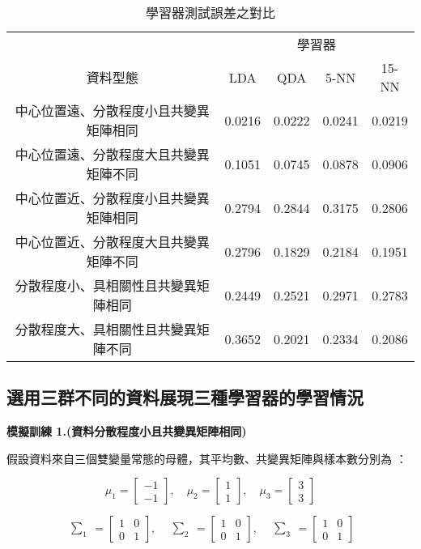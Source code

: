 \begin{table}[H] 
\centering
\caption{學習器測試誤差之對比}\label{tb:error_2}
\tabcolsep=12pt
\begin{tabular}{ccccc} 
\toprule
& \multicolumn{4}{c}{學習器}\\
\cmidrule(l){2-5}
資料型態 & LDA & QDA & 5-NN & 15-NN\\[3pt]
\midrule
中心位置遠、分散程度小且共變異矩陣相同 & \cellcolor{red!25}0.0216 & 0.0222 & 0.0241 & 0.0219  \\[3pt]
中心位置遠、分散程度大且共變異矩陣不同 & 0.1051 & \cellcolor{red!25}0.0745 & 0.0878 & 0.0906 \\[3pt]
中心位置近、分散程度小且共變異矩陣相同 & \cellcolor{red!25}0.2794 & 0.2844 & 0.3175 & 0.2806 \\[3pt]
中心位置近、分散程度大且共變異矩陣不同 & 0.2796 & \cellcolor{red!25}0.1829 & 0.2184 & 0.1951 \\ [3pt]
分散程度小、具相關性且共變異矩陣相同 & \cellcolor{red!25}0.2449 & 0.2521 & 0.2971 & 0.2783 \\ [3pt]
分散程度大、具相關性且共變異矩陣不同 & 0.3652 & \cellcolor{red!25}0.2021 & 0.2334 & 0.2086 \\ 
\bottomrule
\end{tabular}
\end{table} 
\subsection{選用三群不同的資料展現三種學習器的學習情況}
\textbf{\large 模擬訓練 1.(資料分散程度小且共變異矩陣相同)}

假設資料來自三個雙變量常態的母體，其平均數、共變異矩陣與樣本數分別為 ：

\[\mu_1 = \begin{bmatrix}
-1 \\
-1
\end{bmatrix}, \quad \mu_2 = \begin{bmatrix}
1 \\
1
\end{bmatrix}, \quad \mu_3 = \begin{bmatrix}
3 \\
3
\end{bmatrix}\]

\[\begin{matrix} \sum_{1} \end{matrix} = \begin{bmatrix}
1 & 0\\
0 & 1
\end{bmatrix}, \quad \begin{matrix} \sum_{2} \end{matrix} = \begin{bmatrix}
1 & 0\\
0 & 1
\end{bmatrix}, \quad \begin{matrix} \sum_{3} \end{matrix} = \begin{bmatrix}
1 & 0\\
0 & 1
\end{bmatrix}\]

